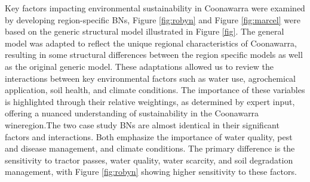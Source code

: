 Key factors impacting environmental sustainability in Coonawarra were examined by developing region-specific BNs, Figure \ref{fig:robyn} and Figure \ref{fig:marcel} were based on the generic structural model illustrated in Figure \ref{fig}. The general model was adapted to reflect the unique regional characteristics of Coonawarra, resulting in some structural differences between the region specific models as well as the original generic model. These adaptations allowed us to review the interactions between key environmental factors such as water use, agrochemical application, soil health, and climate conditions. The importance of these variables is highlighted through their relative weightings, as determined by expert input, offering a nuanced understanding of sustainability in the Coonawarra wineregion.The two case study BNs are almost identical in their significant factors and interactions. Both emphasize the importance of water quality, pest and disease management, and climate conditions. The primary difference is the sensitivity to tractor passes, water quality, water scarcity, and soil degradation management, with Figure \ref{fig:robyn} showing higher sensitivity to these factors. 



